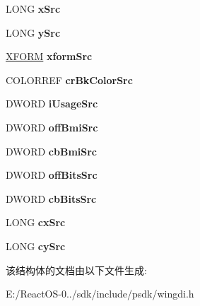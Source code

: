 \begin{DoxyCompactItemize}
L\+O\+NG {\bfseries x\+Src}
\item 
\mbox{\label{structtag_e_m_r_a_l_p_h_a_b_l_e_n_d_a81c26beb0b97a9dc6bc07594e349671d}} 
L\+O\+NG {\bfseries y\+Src}
\item 
\mbox{\label{structtag_e_m_r_a_l_p_h_a_b_l_e_n_d_a312fb9041745232f329d230d85bdfac7}} 
\hyperlink{struct___x_f_o_r_m}{X\+F\+O\+RM} {\bfseries xform\+Src}
\item 
\mbox{\label{structtag_e_m_r_a_l_p_h_a_b_l_e_n_d_a55d94932adccd3a674e450971b219433}} 
C\+O\+L\+O\+R\+R\+EF {\bfseries cr\+Bk\+Color\+Src}
\item 
\mbox{\label{structtag_e_m_r_a_l_p_h_a_b_l_e_n_d_aed56a62de3e30221b1383a3e4185035d}} 
D\+W\+O\+RD {\bfseries i\+Usage\+Src}
\item 
\mbox{\label{structtag_e_m_r_a_l_p_h_a_b_l_e_n_d_afda7a76cfd1eedf9b6dc3aab60806f90}} 
D\+W\+O\+RD {\bfseries off\+Bmi\+Src}
\item 
\mbox{\label{structtag_e_m_r_a_l_p_h_a_b_l_e_n_d_a152a7f7bb8a8b5c5fb5350d993d0ec43}} 
D\+W\+O\+RD {\bfseries cb\+Bmi\+Src}
\item 
\mbox{\label{structtag_e_m_r_a_l_p_h_a_b_l_e_n_d_a894d25b3b1b4abe62ea98add10feef6d}} 
D\+W\+O\+RD {\bfseries off\+Bits\+Src}
\item 
\mbox{\label{structtag_e_m_r_a_l_p_h_a_b_l_e_n_d_ae024084ff8f208835422a2465d6aafc9}} 
D\+W\+O\+RD {\bfseries cb\+Bits\+Src}
\item 
\mbox{\label{structtag_e_m_r_a_l_p_h_a_b_l_e_n_d_a9a7e40762bb8dd522340c5c09fc60015}} 
L\+O\+NG {\bfseries cx\+Src}
\item 
\mbox{\label{structtag_e_m_r_a_l_p_h_a_b_l_e_n_d_a4237155f21c0eb92730a62d869e30dda}} 
L\+O\+NG {\bfseries cy\+Src}
\end{DoxyCompactItemize}


该结构体的文档由以下文件生成\+:\begin{DoxyCompactItemize}
\item 
E\+:/\+React\+O\+S-\/0../sdk/include/psdk/wingdi.\+h\end{DoxyCompactItemize}
